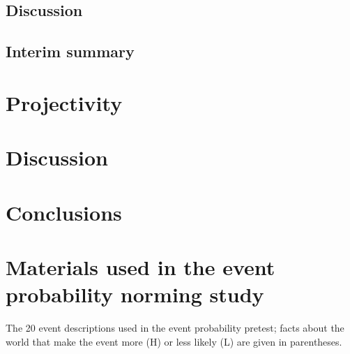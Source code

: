 \documentclass[11pt,fleqn]{article}
\newcommand{\6}{\mbox{$[\hspace*{-.6mm}[$}}
\newcommand{\9}{\mbox{$]\hspace*{-.6mm}]$}}
\begin{document}
\subsection{Discussion}

\subsection{Interim summary}

\section{Projectivity}

\section{Discussion}

\section{Conclusions}\label{s6}


\appendix

\setcounter{table}{0}
\renewcommand{\thetable}{A\arabic{table}}

\setcounter{figure}{0}
\renewcommand{\thefigure}{A\arabic{figure}}

\section{Materials used in the event probability norming study}\label{a-exp1}

The 20 event descriptions used in the event probability pretest; facts about the world that make the event more (H) or less likely (L) are given in parentheses. 
\end{document}
